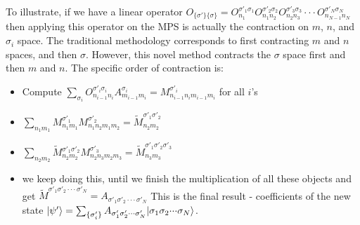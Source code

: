 \documentclass[english]{article}[12pt]
\begin{document}
To illustrate, if we have a linear operator $O_{\{\sigma'\}\{\sigma\}}=O_{n_{1}}^{\sigma'_{1}\sigma_{1}}O_{n_{1}n_{2}}^{\sigma'_{2}\sigma_{2}}O_{n_{2}n_{3}}^{\sigma'_{3}\sigma_{3}}\cdot\cdot\cdot O_{n_{N-1}n_{N}}^{\sigma'_{N}\sigma_{N}}$
then applying this operator on the MPS is actually the contraction
on $m$, $n$, and $\sigma_{i}$ space. The traditional methodology corresponds
to first contracting $m$ and $n$ spaces, and then $\sigma$. However, this
novel method contracts the $\sigma$ space first and then $m$ and
$n$. The specific order of contraction is:
\begin{itemize}
\item Compute $\sum_{\sigma_{i}}O_{n_{i-1}n_{i}}^{\sigma'_{i}\sigma_{i}}A_{m_{i-1}m_{i}}^{\sigma_{i}}=M_{n_{i-1}n_{i}m_{i-1}m_{i}}^{\sigma'_{i}}$
for all $i$'s
\item $\sum_{n_{1}m_{1}}M_{n_{1}m_{1}}^{\sigma'_{1}}M_{n_{1}n_{2}m_{1}m_{2}}^{\sigma'_{2}}=\tilde{M}_{n_{2}m_{2}}^{\sigma'_{1}\sigma'_{2}}$
\item $\sum_{n_{2}m_{2}}\tilde{M}{}_{n_{2}m_{2}}^{\sigma'_{1}\sigma'_{2}}M_{n_{2}n_{3}m_{2}m_{3}}^{\sigma'_{3}}=\tilde{M}_{n_{3}m_{3}}^{\sigma'_{1}\sigma'_{2}\sigma'_{3}}$
\item we keep doing this, until we finish the multiplication of all these objects
and get $\tilde{M}^{\sigma'_{1}\sigma'_{2}\cdot\cdot\cdot\sigma'_{N}}=A_{\sigma'_{1}\sigma'_{2}\cdot\cdot\cdot\sigma'_{N}}$
This is the final result - coefficients of the new state $|\psi'\rangle=\sum_{\{\sigma'_{i}\}}A_{\sigma'_{1}\sigma'_{2}\cdot\cdot\cdot\sigma'_{N}}|\sigma_{1}\sigma_{2}\text{\ensuremath{\cdot}}\text{\ensuremath{\cdot}}\text{\ensuremath{\cdot}}\sigma_{N}\rangle$.
\end{itemize}
\end{document}
